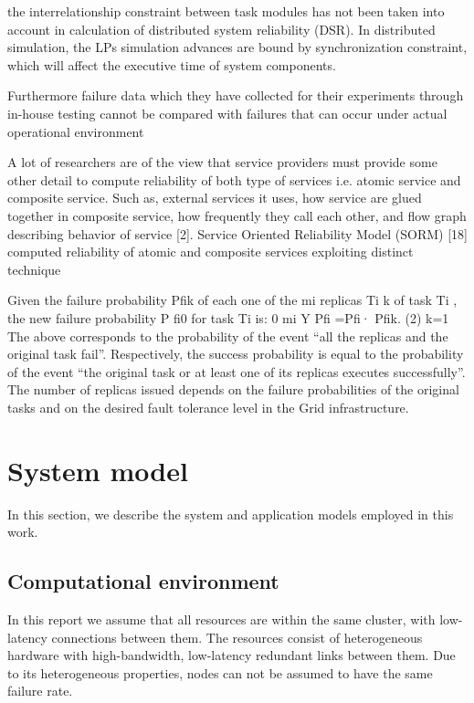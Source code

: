 \documentclass{cslthse-msc}
\begin{document}
the interrelationship constraint between task modules has not been taken into account in calculation of distributed system reliability (DSR). In distributed simulation, the LPs simulation advances are bound by synchronization constraint, which will affect the executive time of system components. \cite{relModelDistSimSystem}

Furthermore failure data which they have collected for their experiments through in-house testing cannot be compared with failures that can occur under actual operational environment \cite{surveyReliabilityDistr}

A lot of researchers are of the view that service providers must provide some other detail to compute reliability of both type of services i.e. atomic service and composite service. Such as, external services it uses, how service are glued together in composite service, how frequently they call each other, and flow graph describing behavior of service [2]. Service Oriented Reliability Model (SORM) [18] computed reliability of atomic and composite services exploiting distinct technique \cite{surveyReliabilityDistr}

Given the failure probability Pfik of each one of the mi replicas Ti k of task Ti , the new failure probability P fi0 for task Ti is:
0 mi Y
Pfi =Pfi· Pfik. (2) k=1
The above corresponds to the probability of the event “all the replicas and the original task fail”. Respectively, the success probability is equal to the probability of the event “the original task or at least one of its replicas executes successfully”. The number of replicas issued depends on the failure probabilities of the original tasks and on the desired fault tolerance level in the Grid infrastructure. \cite{effTaskReplMobGrid}
\fi

\section{System model} \label{sec:design_system_model}
In this section, we describe the system and application models employed in this work.

\subsection{Computational environment} \label{subsec:design_comp_env}
In this report we assume that all resources are within the same cluster, with low-latency connections between them. The resources consist of heterogeneous hardware with high-bandwidth, low-latency redundant links between them. Due to its heterogeneous properties, nodes can not be assumed to have the same failure rate.
\end{document}
